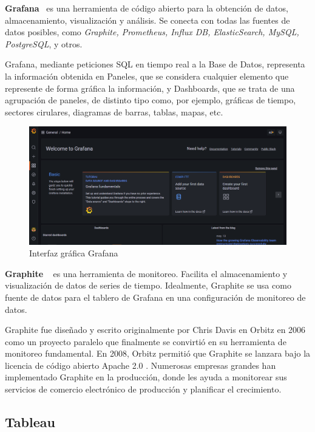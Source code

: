 \documentclass[a4paper, 12pt]{book}
\begin{document}
\textbf{Grafana}~\cite{chakraborty2021grafana} es una herramienta de código abierto para la obtención de datos, almacenamiento, visualización y análisis.
Se conecta con todas las fuentes de datos posibles, como \textit{Graphite, Prometheus, Influx DB, ElasticSearch, MySQL, PostgreSQL}, y otros.

Grafana, mediante peticiones SQL en tiempo real a la Base de Datos, representa la
información obtenida en Paneles, que se considera cualquier elemento que represente de forma gráfica la información, y Dashboards, que se trata de una agrupación de paneles, de distinto tipo como, por ejemplo, gráficas de tiempo, sectores cirulares, diagramas de barras, tablas, mapas, etc.


\begin{figure}[H]
        \centering
        \includegraphics[width=\textwidth]{img/Grafana.png}
        \caption{Interfaz gráfica Grafana}
        \label{figura:Grafana}
    \end{figure}


\textbf{Graphite} ~\cite{Graphite} es una herramienta de monitoreo. Facilita el almacenamiento y visualización de datos de series de tiempo. Idealmente, Graphite se usa como fuente de datos para el tablero de Grafana en una configuración de monitoreo de datos.

Graphite fue diseñado y escrito originalmente por Chris Davis en Orbitz en 2006 como un proyecto paralelo que finalmente se convirtió en su herramienta de monitoreo fundamental. En 2008, Orbitz permitió que Graphite se lanzara bajo la licencia de código abierto Apache 2.0 . Numerosas empresas grandes han implementado Graphite en la producción, donde les ayuda a monitorear sus servicios de comercio electrónico de producción y planificar el crecimiento.

\subsection{Tableau}
\label{sec:tableau}
\end{document}
